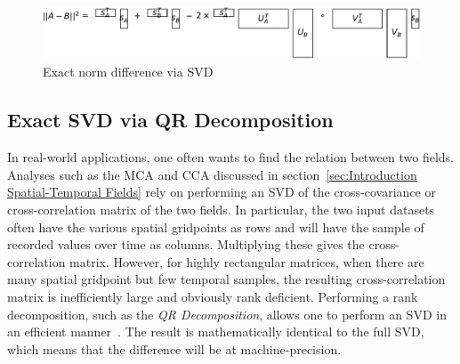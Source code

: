 \documentclass{acm_proc_article-sp}
\begin{document}
\begin{figure}[h]
\begin{center}
\includegraphics[width=\columnwidth]{Results/normDifferenceFromUSVs.pdf}
\caption[Exact norm difference via SVD]{Exact norm difference via SVD}
\label{fig:normDifferenceFromUSVs}
\end{center}
\end{figure}

\subsection{Exact SVD via QR Decomposition}
\label{sec:Techniques Exact SVD via QR Decomposition}

In real-world applications, one often wants to find the relation between two fields. Analyses such as the MCA and CCA discussed in section~\ref{sec:Introduction Spatial-Temporal Fields} rely on performing an SVD of the cross-covariance or cross-correlation matrix of the two fields. In particular, the two input datasets often have the various spatial gridpoints as rows and will have the sample of recorded values over time as columns. Multiplying these gives the cross-correlation matrix. However, for highly rectangular matrices, when there are many spatial gridpoint but few temporal samples, the resulting cross-correlation matrix is inefficiently large and obviously rank deficient. Performing a rank decomposition, such as the \textit{QR Decomposition}, allows one to perform an SVD in an efficient manner~\cite{Chan1982, Tygert2017}. The result is mathematically identical to the full SVD, which means that the difference will be at machine-precision.
\end{document}

